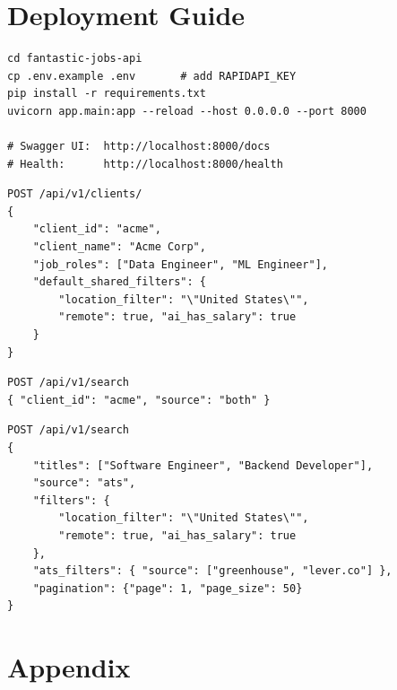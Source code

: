 \documentclass[11pt, a4paper]{article}
\begin{document}
\section{Deployment Guide}

\begin{lstlisting}[style=apistyle, title=\color{codetext}Quick Start]
cd fantastic-jobs-api
cp .env.example .env       # add RAPIDAPI_KEY
pip install -r requirements.txt
uvicorn app.main:app --reload --host 0.0.0.0 --port 8000

# Swagger UI:  http://localhost:8000/docs
# Health:      http://localhost:8000/health
\end{lstlisting}

\begin{lstlisting}[style=apistyle, title=\color{codetext}Example: Onboard Client]
POST /api/v1/clients/
{
    "client_id": "acme",
    "client_name": "Acme Corp",
    "job_roles": ["Data Engineer", "ML Engineer"],
    "default_shared_filters": {
        "location_filter": "\"United States\"",
        "remote": true, "ai_has_salary": true
    }
}
\end{lstlisting}

\begin{lstlisting}[style=apistyle, title=\color{codetext}Example: Search (using stored roles)]
POST /api/v1/search
{ "client_id": "acme", "source": "both" }
\end{lstlisting}

\begin{lstlisting}[style=apistyle, title=\color{codetext}Example: Search (direct titles)]
POST /api/v1/search
{
    "titles": ["Software Engineer", "Backend Developer"],
    "source": "ats",
    "filters": {
        "location_filter": "\"United States\"",
        "remote": true, "ai_has_salary": true
    },
    "ats_filters": { "source": ["greenhouse", "lever.co"] },
    "pagination": {"page": 1, "page_size": 50}
}
\end{lstlisting}

\section{Appendix}
\end{document}
